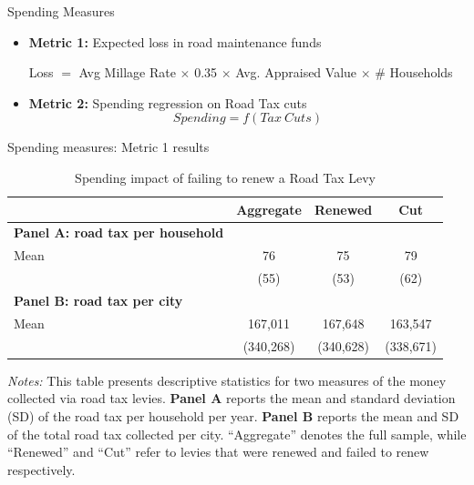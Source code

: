 \documentclass{beamer}
\begin{document}
\begin{frame}[label=spending_measures]{Spending Measures}
    \begin{itemize}
        \item \textbf{Metric 1:} Expected loss in road maintenance funds
        \vskip 0.2cm
        
         Loss $=$ Avg Millage Rate $\times$ 0.35 $\times$ Avg. Appraised Value $\times$ \# Households

         \vskip 0.5cm
        \item \textbf{Metric 2:} Spending regression on Road Tax cuts
        $$ Spending = f(Tax \ Cuts)$$
    \end{itemize}
    \begin{flushright}
        \hyperlink{spending_measure_2}{}
    \end{flushright}           
\end{frame}

\begin{frame}{Spending measures: Metric 1 results}
    \begin{table}[ht]
        \centering
        \caption{Spending impact of failing to renew a Road Tax Levy}
        \label{tab:levy_stats}
        \begin{threeparttable}
        \begin{tabular}{p{4.5cm}ccc}
        \hline\hline
        & \textbf{Aggregate} & \textbf{Renewed} & \textbf{Cut} \\
        \hline
        \textbf{Panel A: road tax per household} \\
        Mean & 76 & 75 & 79 \\
           & (55) & (53) & (62) \\
        \hline
        \textbf{Panel B: road tax per city} \\
        Mean & 167,011 & 167,648 & 163,547 \\
           & (340,268) & (340,628) & (338,671) \\
        \hline\hline
        \end{tabular}
        \begin{tablenotes}[flushleft]
          \footnotesize
          \item \textit{Notes:} 
          This table presents descriptive statistics for two measures of the money collected via road tax levies. 
          \textbf{Panel A} reports the mean and standard deviation (SD) of the road tax per household per year. 
          \textbf{Panel B} reports the mean and SD of the total road tax collected per city. 
          “Aggregate” denotes the full sample, while “Renewed” and “Cut” refer to levies that were renewed and failed to renew respectively.
        \end{tablenotes}
        \end{threeparttable}
    \end{table}    
\end{frame}
\end{document}
